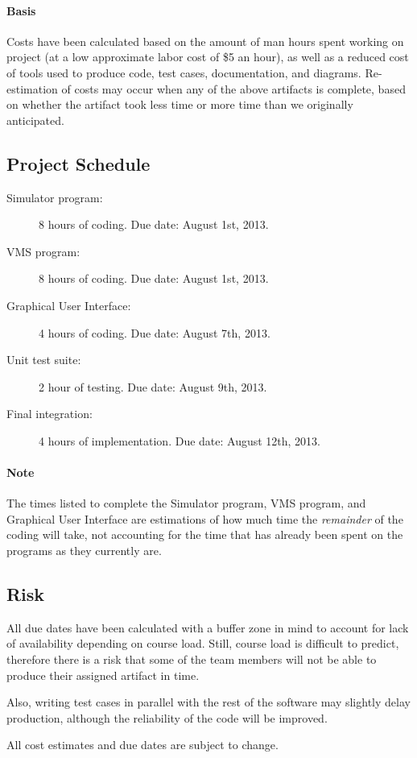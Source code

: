 \documentclass{article}
\begin{document}
\paragraph{Basis} Costs have been calculated based on the amount of man hours spent working on project (at a low approximate labor cost of \$5 an hour), as well as a reduced cost of tools used to produce code, test cases, documentation, and diagrams.
Re-estimation of costs may occur when any of the above artifacts is complete, based on whether the artifact took less time or more time than we originally anticipated.

\subsection{Project Schedule}

\begin{description}
  \item[Simulator program:] 8 hours of coding. Due date: August 1st, 2013.
  \item[VMS program:] 8 hours of coding. Due date: August 1st, 2013.
  \item[Graphical User Interface:] 4 hours of coding. Due date: August 7th, 2013.
  \item[Unit test suite:] 2 hour of testing. Due date: August 9th, 2013.
  \item[Final integration:] 4 hours of implementation. Due date: August 12th, 2013.
\end{description}

\paragraph{Note}
The times listed to complete the Simulator program, VMS program, and Graphical User Interface are estimations of how much time the \emph{remainder} of the coding will take, not accounting for the time that has already been spent on the programs as they currently are.

\subsection{Risk}

	All due dates have been calculated with a buffer zone in mind to account for lack of availability depending on course load. Still, course load is difficult to predict, therefore there is a risk that some of the team members will not be able to produce their assigned artifact in time.

Also, writing test cases in parallel with the rest of the software may slightly delay production, although the reliability of the code will be improved.

All cost estimates and due dates are subject to change.
\end{document}
